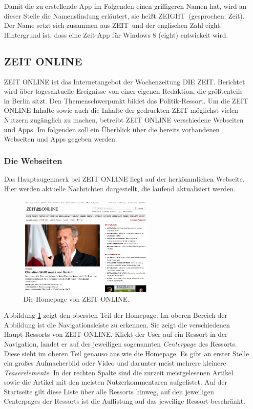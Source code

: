 \documentclass[12pt,a4paper,bibtotoc,abstracton]{scrartcl}
\begin{document}
Damit die zu erstellende App im Folgenden einen griffigeren Namen hat, wird an dieser Stelle die Namensfindung erläutert, sie heißt \glqq ZEIGHT\grqq\ (gesprochen: Zeit). Der Name setzt sich zusammen aus \glqq ZEIT\grqq\ und der englischen Zahl \glqq eight\grqq. Hintergrund ist, dass eine \glqq Zeit\grqq-App für Windows 8 (eight) entwickelt wird.

\subsection{ZEIT ONLINE}
\label{subsec:zeitonline}
ZEIT ONLINE ist das Internetangebot der Wochenzeitung DIE ZEIT. Berichtet wird über tagesaktuelle Ereignisse von einer eigenen Redaktion, die größtenteils in Berlin sitzt. Den Themenschwerpunkt bildet das Politik-Ressort. Um die ZEIT ONLINE Inhalte sowie auch die Inhalte der gedruckten ZEIT möglichst vielen Nutzern zugänglich zu machen, betreibt ZEIT ONLINE verschiedene Webseiten und Apps. Im folgenden soll ein  Überblick über die bereits vorhandenen Webseiten und Apps gegeben werden.

\subsubsection{Die Webseiten}
\label{subsubsec:webseiten}
Das Hauptaugenmerk bei ZEIT ONLINE liegt auf der herkömmlichen Webseite. Hier werden aktuelle Nachrichten dargestellt, die laufend aktualisiert werden.

\begin{figure}[h]	
	\centering
	\includegraphics[width=0.6\textwidth]{Bilder/Screenshots/zeit.de/homepage.png} 
	\caption{Die Homepage von ZEIT ONLINE.}
	\label{fig:homepage}
\end{figure}

Abbildung \ref{fig:homepage} zeigt den obersten Teil der Homepage. Im oberen Bereich der Abbildung ist die Navigationsleiste zu erkennen. Sie zeigt die verschiedenen Haupt-Ressorts von ZEIT ONLINE. Klickt der User auf ein Ressort in der Navigation, landet er auf der jeweiligen sogenannten \textit{Centerpage} des Ressorts. Diese sieht im oberen Teil genauso aus wie die Homepage. Es gibt an erster Stelle ein großes Aufmacherbild oder Video und darunter meist mehrere kleinere \textit{Teaserelemente}. In der rechten Spalte sind die zurzeit meistgelesenen Artikel sowie die Artikel mit den meisten Nutzerkommentaren aufgelistet. Auf der Startseite gilt diese Liste über alle Ressorts hinweg, auf den jeweiligen Centerpages der Ressorts ist die Auflistung auf das jeweilige Ressort beschränkt.
\end{document}
